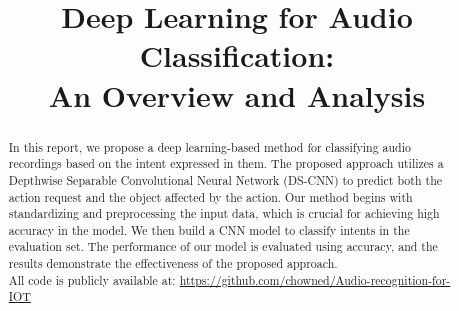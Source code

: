 \documentclass[conference]{IEEEtran}
\begin{document}
\title{Deep Learning for Audio Classification:\\ 
An Overview and Analysis }

\author{
\IEEEauthorblockA{\textit{Politecnico di Torino} \\
Student id: s280209 \\
\href{mailto:gaetanosalvatore.falco@studenti.polito.it}{gaetanosalvatore.falco@studenti.polito.it}
 }
\and
{}
}

\maketitle
\begin{abstract}
In this report, we propose a deep learning-based method for classifying audio recordings based on the intent expressed in them. The proposed approach utilizes a Depthwise Separable Convolutional Neural Network (DS-CNN) to predict both the action request and the object affected by the action. Our method begins with standardizing and preprocessing the input data, which is crucial for achieving high accuracy in the model. We then build a CNN model to classify intents in the evaluation set. The performance of our model is evaluated using accuracy, and the results demonstrate the effectiveness of the proposed approach.\\
All code is publicly available at: \url{https://github.com/chowned/Audio-recognition-for-IOT}

\end{abstract}
\end{document}
